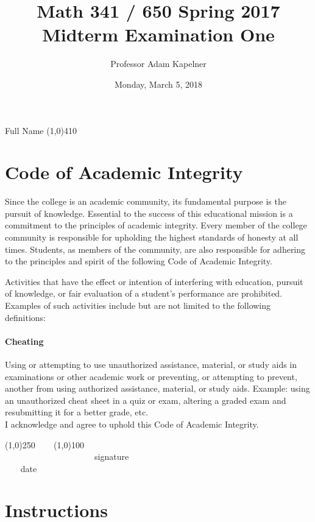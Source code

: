 \documentclass[12pt]{article}
\title{Math 341 / 650 Spring 2017 \\ Midterm Examination One}
\author{Professor Adam Kapelner}
\date{Monday, March 5, 2018}
\begin{document}
\maketitle

\noindent Full Name \line(1,0){410}

\thispagestyle{empty}

\section*{Code of Academic Integrity}

\footnotesize
Since the college is an academic community, its fundamental purpose is the pursuit of knowledge. Essential to the success of this educational mission is a commitment to the principles of academic integrity. Every member of the college community is responsible for upholding the highest standards of honesty at all times. Students, as members of the community, are also responsible for adhering to the principles and spirit of the following Code of Academic Integrity.

Activities that have the effect or intention of interfering with education, pursuit of knowledge, or fair evaluation of a student's performance are prohibited. Examples of such activities include but are not limited to the following definitions:

\paragraph{Cheating} Using or attempting to use unauthorized assistance, material, or study aids in examinations or other academic work or preventing, or attempting to prevent, another from using authorized assistance, material, or study aids. Example: using an unauthorized cheat sheet in a quiz or exam, altering a graded exam and resubmitting it for a better grade, etc.
\\

\noindent I acknowledge and agree to uphold this Code of Academic Integrity. \\

\begin{center}
\line(1,0){250} ~~~ \line(1,0){100}\\
~~~~~~~~~~~~~~~~~~~~~signature~~~~~~~~~~~~~~~~~~~~~~~~~~~~~~~~~~~~~~~~~~~~~ date
\end{center}

\normalsize

\section*{Instructions}
\end{document}
